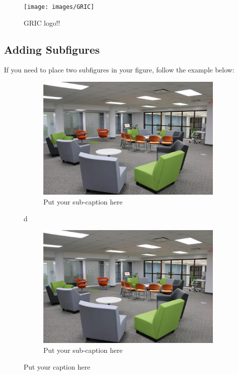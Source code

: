 \begin{figure}[h]
		\begin{center}
			\texttt{[image: images/GRIC]} %
		\end{center}
	\caption{GRIC logo!!} %
	\label{gric}
\end{figure}

%


\subsection{Adding Subfigures}
\noindent If you need to place two subfigures in your figure, follow the example below:

\begin{figure}[h!]
\begin{subfigure}{.48\textwidth}
  \centering
  \includegraphics[width=.8\linewidth]{images/2}  
  \caption{Put your sub-caption here}
  \label{fig:sub-first}
\end{subfigure}d
\begin{subfigure}{.48\textwidth}
  \centering
  \includegraphics[width=.8\linewidth]{images/2}  
  \caption{Put your sub-caption here}
  \label{fig:sub-second}
\end{subfigure}
\caption{Put your caption here}
\end{figure}


